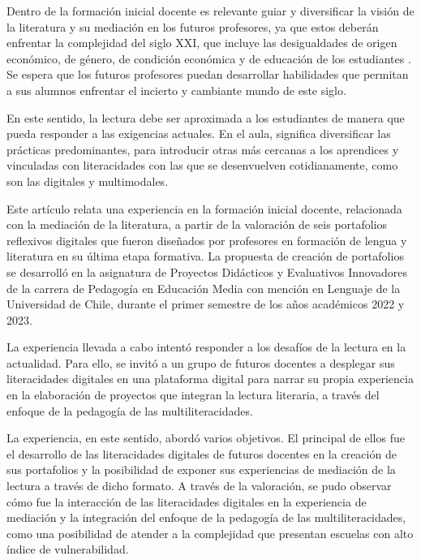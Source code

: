 Dentro de la formación inicial docente es relevante guiar y diversificar
la visión de la literatura y su mediación en los futuros profesores, ya
que estos deberán enfrentar la complejidad del siglo XXI, que incluye
las desigualdades de origen económico, de género, de condición económica
y de educación de los estudiantes \cite{oecd_2019}. Se espera que los
futuros profesores puedan desarrollar habilidades que permitan a sus
alumnos enfrentar el incierto y cambiante mundo de este siglo.

En este sentido, la lectura debe ser aproximada a los estudiantes de
manera que pueda responder a las exigencias actuales. En el aula,
significa diversificar las prácticas predominantes, para introducir
otras más cercanas a los aprendices y vinculadas con literacidades con
las que se desenvuelven cotidianamente, como son las digitales y
multimodales.

Este artículo relata una experiencia en la formación inicial docente,
relacionada con la mediación de la literatura, a partir de la valoración
de seis portafolios reflexivos digitales que fueron diseñados por
profesores en formación de lengua y literatura en su última etapa
formativa. La propuesta de creación de portafolios se desarrolló en la
asignatura de Proyectos Didácticos y Evaluativos Innovadores de la
carrera de Pedagogía en Educación Media con mención en Lenguaje de la
Universidad de Chile, durante el primer semestre de los años académicos
2022 y 2023.

La experiencia llevada a cabo intentó responder a los desafíos de la
lectura en la actualidad. Para ello, se invitó a un grupo de futuros
docentes a desplegar sus literacidades digitales en una plataforma
digital para narrar su propia experiencia en la elaboración de proyectos
que integran la lectura literaria, a través del enfoque de la pedagogía
de las multiliteracidades.

La experiencia, en este sentido, abordó varios objetivos. El principal
de ellos fue el desarrollo de las literacidades digitales de futuros
docentes en la creación de sus portafolios y la posibilidad de exponer
sus experiencias de mediación de la lectura a través de dicho formato. A
través de la valoración, se pudo observar cómo fue la interacción de las
literacidades digitales en la experiencia de mediación y la integración
del enfoque de la pedagogía de las multiliteracidades, como una
posibilidad de atender a la complejidad que presentan escuelas con alto
índice de vulnerabilidad.
